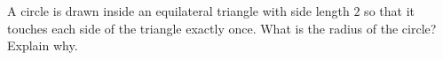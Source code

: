 A circle is drawn inside an equilateral triangle with side length $2$ so that it touches each side of the triangle exactly once. What is the radius of the circle? Explain why.
